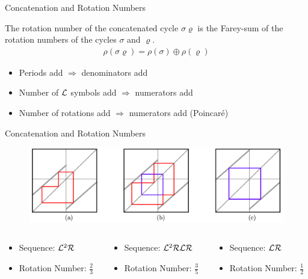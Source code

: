 \begin{frame}{Concatenation and Rotation Numbers}
	\begin{theorem}
		The rotation number of the concatenated cycle $\sigma\varrho$ is the Farey-sum of the rotation numbers of the cycles $\sigma$ and $\varrho$.
		\begin{align*}
			\rho(\sigma\varrho) = \rho(\sigma) \oplus \rho(\varrho)
		\end{align*}
	\end{theorem}

	\pause
	\begin{itemize}
		\item Periods add $\Rightarrow$ denominators add
		\item Number of $\mathcal{L}$ symbols add $\Rightarrow$ numerators add
		\item Number of rotations add $\Rightarrow$ numerators add (Poincaré)
	\end{itemize}
\end{frame}

\begin{frame}{Concatenation and Rotation Numbers}
	\begin{figure}
		\includegraphics[width=.8 \textwidth]{Figs/PeriodAddingCobwebs_Slides.png}
	\end{figure}
	\begin{columns}
		\begin{column}{.3 \textwidth}
			\begin{itemize}
				\item Sequence: $\mathcal{L}^2\mathcal{R}$
				\item Rotation Number: $\frac{2}{3}$
			\end{itemize}
		\end{column}
		\begin{column}{.3 \textwidth}
			\begin{itemize}
				\item Sequence: $\mathcal{L}^2\mathcal{R}\mathcal{L}\mathcal{R}$
				\item Rotation Number: $\frac{3}{5}$
			\end{itemize}
		\end{column}
		\begin{column}{.3 \textwidth}
			\begin{itemize}
				\item Sequence: $\mathcal{L}\mathcal{R}$
				\item Rotation Number: $\frac{1}{2}$
			\end{itemize}
		\end{column}
	\end{columns}
\end{frame}

